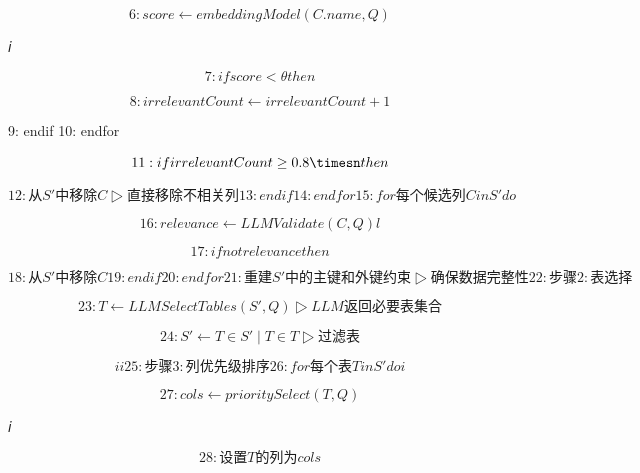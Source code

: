 \documentclass[12pt,a4paper,openright,UTF8]{ctexbook}
\begin{document}
\begin{equation}
6: score \leftarrow embeddingModel (C.name,Q)
\end{equation}

𝑖

\begin{equation}
7: if score < \theta then
\end{equation}


\begin{equation}
8: irrelevantCount \leftarrow irrelevantCount+1
\end{equation}

9: endif 10: endfor

\begin{equation}
11: if irrelevantCount \geq 0.8\timesn then
\end{equation}


\begin{equation}
12: 从S' 中移除C ▷直接移除不相关列13: endif 14: endfor 15: for每个候选列C inS' do
\end{equation}


\begin{equation}
16: relevance \leftarrow LLMValidate(C,Q)l
\end{equation}


\begin{equation}
17: if notrelevancethen
\end{equation}


\begin{equation}
18: 从S' 中移除C19: endif 20: endfor 21: 重建S' 中的主键和外键约束 ▷确保数据完整性22:步骤2: 表选择
\end{equation}


\begin{equation}
23: T \leftarrow LLMSelectTables(S',Q) ▷LLM返回必要表集合
\end{equation}


\begin{equation}
24: S' \leftarrow {T \in S' ∣ T \in T} ▷过滤表
\end{equation}


\begin{equation}
i i25:步骤3: 列优先级排序26: for每个表T inS' doi
\end{equation}


\begin{equation}
27: cols \leftarrow prioritySelect(T ,Q)
\end{equation}

𝑖

\begin{equation}
28: 设置T 的列为cols
\end{equation}
\end{document}
